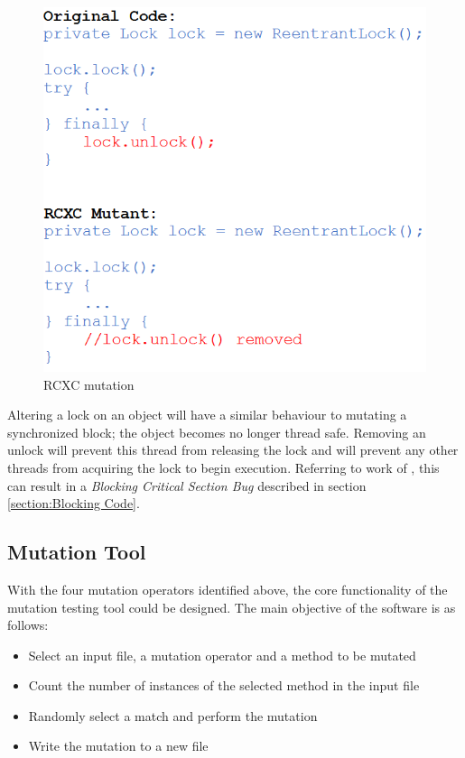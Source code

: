 \documentclass[a4paper,12pt]{article}
\begin{document}
\begin{figure}[h]
    \centering
    \includegraphics[scale = 0.6]{RCXC.png}
    \caption{RCXC mutation \citep{bradbury06}}
    \label{fig:RCXC}
\end{figure}	

Altering a lock on an object will have a similar behaviour to mutating a synchronized block; the object becomes no longer thread safe. Removing an unlock will prevent this thread from releasing the lock and will prevent any other threads from acquiring the lock to begin execution. Referring to work of \citeauthor{farchi03}, this can result in a \textit{Blocking Critical Section Bug} described in section \ref{section:Blocking Code}.   
  	
	
\subsection{Mutation Tool}

With the four mutation operators identified above, the core functionality of the mutation testing tool could be designed. The main objective of the software is as follows: 

\begin{itemize}
    \item Select an input file, a mutation operator and a method to be mutated
    \item Count the number of instances of the selected method in the input file
    \item Randomly select a match and perform the mutation
    \item Write the mutation to a new file
\end{itemize}
\end{document}

